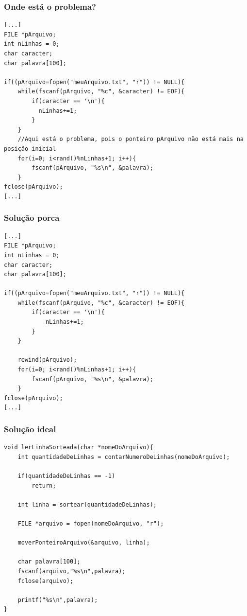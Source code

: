 \begin{frame}[fragile]
	\frametitle{Onde está o problema?}

	\begin{listing}[H]
		\begin{verbatim}
[...]
FILE *pArquivo;
int nLinhas = 0;
char caracter;
char palavra[100];

if((pArquivo=fopen("meuArquivo.txt", "r")) != NULL){
	while(fscanf(pArquivo, "%c", &caracter) != EOF){
		if(caracter == '\n'){
		  nLinhas+=1;
		}
	}
	//Aqui está o problema, pois o ponteiro pArquivo não está mais na posição inicial
	for(i=0; i<rand()%nLinhas+1; i++){
		fscanf(pArquivo, "%s\n", &palavra);
	}
fclose(pArquivo);
[...]
		\end{verbatim}
	\end{listing}

\end{frame}

\begin{frame}[fragile]
	\frametitle{Solução porca}

	\begin{listing}[H]
		\begin{verbatim}
[...]
FILE *pArquivo;
int nLinhas = 0;
char caracter;
char palavra[100];

if((pArquivo=fopen("meuArquivo.txt", "r")) != NULL){
	while(fscanf(pArquivo, "%c", &caracter) != EOF){
		if(caracter == '\n'){
			nLinhas+=1;
		}
	}

	rewind(pArquivo);
	for(i=0; i<rand()%nLinhas+1; i++){
		fscanf(pArquivo, "%s\n", &palavra);
	}
fclose(pArquivo);
[...]
		\end{verbatim}
	\end{listing}

\end{frame}

\begin{frame}[fragile]
	\frametitle{Solução ideal}

	\begin{listing}[H]
		\begin{verbatim}
void lerLinhaSorteada(char *nomeDoArquivo){
	int quantidadeDeLinhas = contarNumeroDeLinhas(nomeDoArquivo);

	if(quantidadeDeLinhas == -1)
		return;

	int linha = sortear(quantidadeDeLinhas);

	FILE *arquivo = fopen(nomeDoArquivo, "r");

	moverPonteiroArquivo(&arquivo, linha);

	char palavra[100];
	fscanf(arquivo,"%s\n",palavra);
	fclose(arquivo);

	printf("%s\n",palavra);
}
		\end{verbatim}
	\end{listing}

\end{frame}

